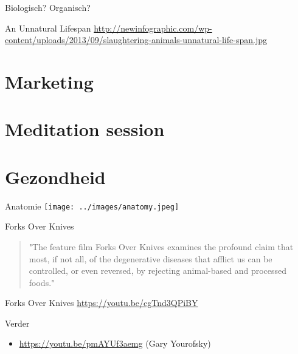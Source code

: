 \documentclass[presentation]{beamer}
\begin{document}
\begin{frame}[label=sec-1-6]{Biologisch? Organisch?}
\begin{alertblock}{An Unnatural Lifespan}
\url{http://newinfographic.com/wp-content/uploads/2013/09/slaughtering-animals-unnatural-life-span.jpg}
\end{alertblock}
\end{frame}

\section{Marketing}
\label{sec-2}

\section{Meditation session}
\label{sec-3}

\section{Gezondheid}
\label{sec-4}

\begin{frame}[label=sec-4-1]{Anatomie}
\texttt{[image: ../images/anatomy.jpeg]}
\end{frame}

\begin{frame}[label=sec-4-2]{Forks Over Knives}
\begin{quotation}
"The feature film Forks Over Knives examines the profound claim that most, if not all, of the degenerative diseases that afflict us can be controlled, or even reversed, by rejecting animal-based and processed foods."
\end{quotation}

\begin{alertblock}{Forks Over Knives}
\url{https://youtu.be/cgTnd3QPiBY}
\end{alertblock}
\end{frame}

\begin{frame}[label=sec-4-3]{Verder}
\begin{itemize}
\item \url{https://youtu.be/pmAYUf3aemg} (Gary Yourofsky)
\end{itemize}
\end{frame}
\end{document}
